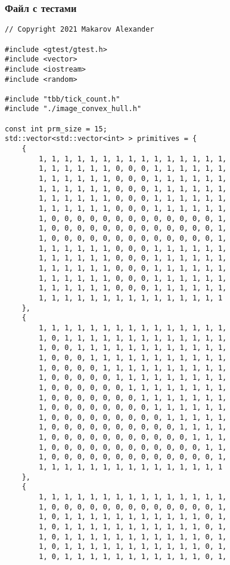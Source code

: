 \documentclass{report}
\begin{document}
\subsubsection{Файл с тестами}
\begin{lstlisting}
// Copyright 2021 Makarov Alexander

#include <gtest/gtest.h>
#include <vector>
#include <iostream>
#include <random>

#include "tbb/tick_count.h"
#include "./image_convex_hull.h"

const int prm_size = 15;
std::vector<std::vector<int> > primitives = {
    {
        1, 1, 1, 1, 1, 1, 1, 1, 1, 1, 1, 1, 1, 1, 1,
        1, 1, 1, 1, 1, 1, 0, 0, 0, 1, 1, 1, 1, 1, 1,
        1, 1, 1, 1, 1, 1, 0, 0, 0, 1, 1, 1, 1, 1, 1,
        1, 1, 1, 1, 1, 1, 0, 0, 0, 1, 1, 1, 1, 1, 1,
        1, 1, 1, 1, 1, 1, 0, 0, 0, 1, 1, 1, 1, 1, 1,
        1, 1, 1, 1, 1, 1, 0, 0, 0, 1, 1, 1, 1, 1, 1,
        1, 0, 0, 0, 0, 0, 0, 0, 0, 0, 0, 0, 0, 0, 1,
        1, 0, 0, 0, 0, 0, 0, 0, 0, 0, 0, 0, 0, 0, 1,
        1, 0, 0, 0, 0, 0, 0, 0, 0, 0, 0, 0, 0, 0, 1,
        1, 1, 1, 1, 1, 1, 0, 0, 0, 1, 1, 1, 1, 1, 1,
        1, 1, 1, 1, 1, 1, 0, 0, 0, 1, 1, 1, 1, 1, 1,
        1, 1, 1, 1, 1, 1, 0, 0, 0, 1, 1, 1, 1, 1, 1,
        1, 1, 1, 1, 1, 1, 0, 0, 0, 1, 1, 1, 1, 1, 1,
        1, 1, 1, 1, 1, 1, 0, 0, 0, 1, 1, 1, 1, 1, 1,
        1, 1, 1, 1, 1, 1, 1, 1, 1, 1, 1, 1, 1, 1, 1
    },
    {
        1, 1, 1, 1, 1, 1, 1, 1, 1, 1, 1, 1, 1, 1, 1,
        1, 0, 1, 1, 1, 1, 1, 1, 1, 1, 1, 1, 1, 1, 1,
        1, 0, 0, 1, 1, 1, 1, 1, 1, 1, 1, 1, 1, 1, 1,
        1, 0, 0, 0, 1, 1, 1, 1, 1, 1, 1, 1, 1, 1, 1,
        1, 0, 0, 0, 0, 1, 1, 1, 1, 1, 1, 1, 1, 1, 1,
        1, 0, 0, 0, 0, 0, 1, 1, 1, 1, 1, 1, 1, 1, 1,
        1, 0, 0, 0, 0, 0, 0, 1, 1, 1, 1, 1, 1, 1, 1,
        1, 0, 0, 0, 0, 0, 0, 0, 1, 1, 1, 1, 1, 1, 1,
        1, 0, 0, 0, 0, 0, 0, 0, 0, 1, 1, 1, 1, 1, 1,
        1, 0, 0, 0, 0, 0, 0, 0, 0, 0, 1, 1, 1, 1, 1,
        1, 0, 0, 0, 0, 0, 0, 0, 0, 0, 0, 1, 1, 1, 1,
        1, 0, 0, 0, 0, 0, 0, 0, 0, 0, 0, 0, 1, 1, 1,
        1, 0, 0, 0, 0, 0, 0, 0, 0, 0, 0, 0, 0, 1, 1,
        1, 0, 0, 0, 0, 0, 0, 0, 0, 0, 0, 0, 0, 0, 1,
        1, 1, 1, 1, 1, 1, 1, 1, 1, 1, 1, 1, 1, 1, 1
    },
    {
        1, 1, 1, 1, 1, 1, 1, 1, 1, 1, 1, 1, 1, 1, 1,
        1, 0, 0, 0, 0, 0, 0, 0, 0, 0, 0, 0, 0, 0, 1,
        1, 0, 1, 1, 1, 1, 1, 1, 1, 1, 1, 1, 1, 0, 1,
        1, 0, 1, 1, 1, 1, 1, 1, 1, 1, 1, 1, 1, 0, 1,
        1, 0, 1, 1, 1, 1, 1, 1, 1, 1, 1, 1, 1, 0, 1,
        1, 0, 1, 1, 1, 1, 1, 1, 1, 1, 1, 1, 1, 0, 1,
        1, 0, 1, 1, 1, 1, 1, 1, 1, 1, 1, 1, 1, 0, 1,

\end{lstlisting}
\end{document}
